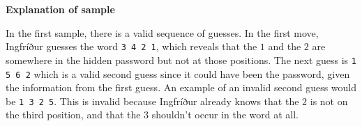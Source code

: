 \textbf{Explanation of sample}

In the first sample, there is a valid sequence of guesses. In the first move, 
Ingfríður guesses the word \verb|3 4 2 1|, which reveals that the $1$ and the $2$
are somewhere in the hidden password but not at those positions. The next guess 
is \verb|1 5 6 2| which is a valid second guess since it could have been the 
password, given the information from the first guess. An example of an invalid 
second guess would be \verb|1 3 2 5|. This is invalid because Ingfríður already
knows that the $2$ is not on the third position, and that the $3$ shouldn't 
occur in the word at all.